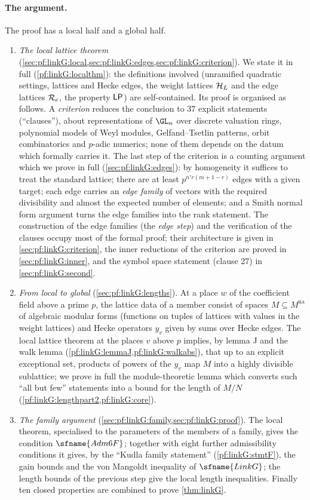 \paragraph{The argument.}
The proof has a local half and a global half.
\begin{enumerate}[label=(\arabic*)]
\item \emph{The local lattice theorem} (\cref{sec:pf:linkG:local,sec:pf:linkG:edges,sec:pf:linkG:criterion}).
We state it in full (\cref{pf:linkG:localthm}): the definitions involved (unramified quadratic settings, lattices
and Hecke edges, the weight lattices $\mathcal H_L$ and the edge lattices $\mathcal R_e$, the property $\mathsf{LP}$) are
self-contained. Its proof is organised as follows. A \emph{criterion} reduces the conclusion to $37$ explicit
statements (``clauses''), about representations of $\GL_n$ over discrete valuation rings, polynomial models of Weyl
modules, Gelfand--Tsetlin patterns, orbit combinatorics and $p$-adic numerics; none of them depends on the datum which
formally carries it. The last step of the criterion is a counting argument which we prove in full
(\cref{sec:pf:linkG:edges}): by homogeneity it suffices to treat the standard lattice; there are at least
$p^{n'r(m+1-r)}$ edges with a given target; each edge carries an \emph{edge family} of vectors with the required
divisibility and almost the expected number of elements; and a Smith normal form argument turns the edge families
into the rank statement. The construction of the edge families (the \emph{edge step}) and the verification of the
clauses occupy most of the formal proof; their architecture is given in \cref{sec:pf:linkG:criterion}, the inner
reductions of the criterion are proved in \cref{sec:pf:linkG:inner}, and the symbol space statement (clause 27) in
\cref{sec:pf:linkG:second}.
\item \emph{From local to global} (\cref{sec:pf:linkG:lengths}). At a place $w$ of the coefficient field above a
prime $p$, the lattice data of a member consist of spaces $M\subseteq M^{\mathrm{na}}$ of algebraic modular forms
(functions on tuples of lattices with values in the weight lattices) and Hecke operators $y_v$ given by sums over
Hecke edges. The local lattice theorem at the places $v$ above $p$ implies, by lemma J and the walk lemma
(\cref{pf:linkG:lemmaJ,pf:linkG:walkabs}), that up to an explicit exceptional set, products of powers of the $y_v$ map $M$
into a highly divisible sublattice; we prove in full the
module-theoretic lemma which converts such ``all but few'' statements into a bound for the length of
$M/N$ (\cref{pf:linkG:lengthpart2,pf:linkG:core}).
\item \emph{The family argument} (\cref{sec:pf:linkG:family,sec:pf:linkG:proof}). The local theorem, specialised to
the parameters of the members of a family, gives the condition $\sfname{Adm6F}$; together with eight further
admissibility conditions it gives, by the ``Kudla family statement'' (\cref{pf:linkG:stmtF}), the gain bounds and
the von Mangoldt inequality of $\sfname{LinkG}$; the length bounds of the previous step give the local length
inequalities. Finally ten closed properties are combined to prove \cref{thm:linkG}.
\end{enumerate}

